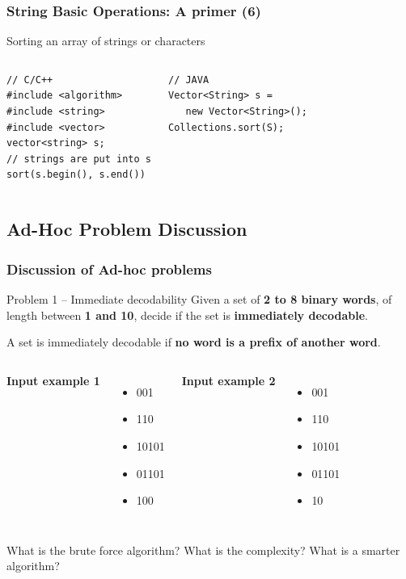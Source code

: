 \documentclass{beamer}
\begin{document}
\begin{frame}[fragile]
  \frametitle{String Basic Operations: A primer (6)}
  {\smaller
    \begin{block}{Sorting an array of strings or characters}
      \begin{columns}[T]
\begin{verbatim}
// C/C++
#include <algorithm>
#include <string>
#include <vector>
vector<string> s;
// strings are put into s
sort(s.begin(), s.end())
\end{verbatim}
\begin{verbatim}
// JAVA
Vector<String> s =
   new Vector<String>();
Collections.sort(S);

\end{verbatim}
      \end{columns}
    \end{block}
  }
\end{frame}

\subsection{Ad-Hoc Problem Discussion}

\begin{frame}
  \frametitle{Discussion of Ad-hoc problems}

    \begin{exampleblock}{Problem 1 -- Immediate decodability}
      Given a set of {\bf 2 to 8 binary words}, of length
      between {\bf 1 and 10}, decide if the set is {\bf immediately
      decodable}. \bigskip

      A set is immediately decodable if {\bf no word is a prefix of
      another word}.
    \end{exampleblock}

    \begin{columns}
      {\bf Input example 1}
      \begin{itemize}
        \item 001
        \item 110
        \item 10101
        \item 01101
        \item 100
      \end{itemize}
      {\bf Input example 2}
      \begin{itemize}
        \item 001
        \item 110
        \item 10101
        \item 01101
        \item 10
      \end{itemize}
    \end{columns}\bigskip

    What is the brute force algorithm? What is the complexity? What
    is a smarter algorithm?
\end{frame}
\end{document}
